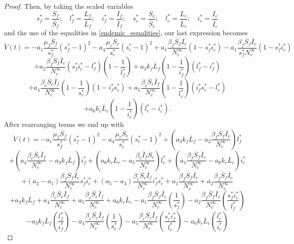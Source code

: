 \documentclass[preprint, 12pt]{elsarticle}
\begin{document}
\begin{proof}
    \noindent Then, by taking the scaled variables
    $$
    s_f^*=\frac{S_f}{\overline{S}_f};\quad
    l_f^*=\frac{L_f}{\overline{L}_f};\quad
    i_f^*=\frac{I_f}{\overline{I}_f};\quad
    s_c^*=\frac{S_c}{\overline{S}_c};\quad
    l_c^*=\frac{L_c}{\overline{L}_c};\quad i_c^*=\frac{I_c}{\overline{I}_c}
    $$
    and the use of the equalities in \ref{endemic_equalities}, our last
    expression becomes
    $$\dot{V}(t)=-a_1\frac{\mu_f\overline{S}_f}{s_f^*}\left(s_f^*-1\right)^2-a_4\frac{\mu_c\overline{S}_c}{s_c^*}\left(s_c^*-1\right)^2+a_1\frac{\beta_f\overline{S}_f\overline{I}_c}{N_c^{\infty}}(1-s_f^*i_c^*)-a_1\frac{\beta_f\overline{S}_f\overline{I}_c}{s_f^*N_c^{\infty}}(1-s_f^*i_c^*)$$
    $$+a_2\frac{\beta_f\overline{S}_f\overline{I}_c}{N_c^{\infty}}\left(s_f^*i_c^*-l_f^*\right)\left(1-\frac{1}{l_f^*}\right)+a_3k_f\overline{L}_f\left(1-\frac{1}{i_f^*}\right)\left(l_f^*-i_f^*\right)$$
    $$+a_4\frac{\beta_c\overline{S}_c\overline{I}_f}{N_c^{\infty}}\left(1-\frac{1}{s_c^*}\right)\left(1-i_f^*s_c^*\right)+a_5\frac{\beta_c\overline{S}_c\overline{I}_f}{N_c^{\infty}}\left(1-\frac{1}{l_c^*}\right)\left(i_f^*s_c^*-l_c^*\right)$$
    $$+a_6k_c\overline{L}_c\left(1-\frac{1}{i_c^*}\right)\left(l_c^*-i_c^*\right).$$
    After rearranging terms we end up with
    $$\dot{V}(t)=-a_1\frac{\mu_f\overline{S}_f}{s_f^*}\left(s_f^*-1\right)^2-a_4\frac{\mu_c\overline{S}_c}{s_c^*}\left(s_c^*-1\right)^2+\left(a_3k_f\overline{L}_f-a_2\frac{\beta_f\overline{S}_f\overline{I}_c}{N_c^{\infty}}\right)l_f^*$$
    $$+\left(a_4\frac{\beta_c\overline{S}_c\overline{I}_f}{N_c^{\infty}}-a_3k_f\overline{L}_f\right)i_f^*+\left(a_6k_c\overline{L}_c-a_5\frac{\beta_c\overline{I}_f\overline{S}_c}{N_c^{\infty}}\right)l_c^*+\left(a_1\frac{\beta_f\overline{S}_f\overline{I}_c}{N_c^{\infty}}-a_6k_c\overline{L}_c\right)i_c^*$$
    $$+\left(a_2-a_1\right)\frac{\beta_f\overline{S}_f\overline{I}_c}{N_c^{\infty}}s_f^*i_c^*+\left(a_5-a_4\right)\frac{\beta_c\overline{S}_c\overline{I}_f}{N_c^{\infty}}i_f^*s_c^*+a_1\frac{\beta_f\overline{S}_f\overline{I}_c}{N_c^{\infty}}+a_2\frac{\beta_f\overline{S}_f\overline{I}_c}{N_c^{\infty}}$$
    $$+a_3k_f\overline{L}_f+a_4\frac{\beta_c\overline{S}_c\overline{I}_f}{N_c^{\infty}}+a_5\frac{\beta_c\overline{S}_c\overline{I}_f}{N_c^{\infty}}+a_6k_c\overline{L}_c-a_1\frac{\beta_f\overline{S}_f\overline{I}_c}{N_c^{\infty}}\left(\frac{1}{s_f^*}\right)-a_2\frac{\beta_f\overline{S}_f\overline{I}_c}{N_c^{\infty}}\left(\frac{s_f^*i_c^*}{l_f^*}\right)$$
    $$-a_3k_f\overline{L}_f\left(\frac{l_f^*}{i_f^*}\right)-a_4\frac{\beta_c\overline{S}_c\overline{I}_f}{N_c^{\infty}}\left(\frac{1}{s_c^*}\right)-a_5\frac{\beta_c\overline{S}_c\overline{I}_f}{N_c^{\infty}}\left(\frac{s_c^*i_f^*}{l_c^*}\right)-a_6k_c\overline{L}_c\left(\frac{l_c^*}{i_c^*}\right)
     $$


\end{proof}
\end{document}
